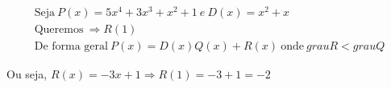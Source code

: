 \begin{eqnarray*}
\text{Seja}\ P(x) =5x^4 + 3x^3 + x^2 + 1\ e\ 
		D(x)= x^2+x\\
		\text{Queremos}\ 
		\Rightarrow
		R(1)\\
		\text{De forma geral}\ P(x)=D(x)Q(x)+R(x)\ \text{onde}\ grau{R}<grau{Q}
\end{eqnarray*}
\begin{center}
\end{center}
Ou seja, $R(x)=-3x+1 \Rightarrow R(1)=-3+1=-2$

